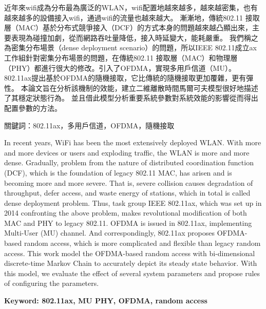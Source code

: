 \begin{abstractzh}
近年來wifi成為分布最為廣泛的WLAN，wifi配置地越來越多，越來越密集，也有越來越多的設備接入wifi，通過wifi的流量也越來越大。
漸漸地，傳統802.11 接取層（MAC）基於分布式競爭接入（DCF）的方式本身的問題越來越凸顯出來，主要表現為碰撞加劇，從而網路吞吐量降低，接入時延變大，能耗嚴重。
我們稱之為密集分布場景（dense deployment scenario）的問題，所以IEEE 802.11成立ax工作組針對密集分布場景的問題，在傳統802.11 接取層（MAC）和物理層（PHY）都進行很大的修改。引入了OFDMA，實現多用戶信道（MU）。
802.11ax提出基於OFDMA的隨機接取，它比傳統的隨機接取更加覆雜，更有彈性。
本論文旨在分析該機制的效能，建立二維離散時間馬爾可夫模型很好地描述了其穩定狀態行為。
並且借此模型分析重要系統參數對系統效能的影響從而得出配置參數的方法。

\noindent
關鍵詞：802.11ax，多用戶信道，OFDMA，隨機接取
\end{abstractzh}

\begin{abstracten}
In recent years, WiFi has been the most extensively deployed WLAN. 
With more and more devices or users and exploding traffic, the WLAN is more and more dense. 
Gradually, problem from the nature of distributed coordination function (DCF), which is the foundation of legacy 802.11 MAC, has arisen and is becoming more and more severe. 
That is, severe collision causes degradation of throughput, defer access, and waste energy of stations, which in total is called dense deployment problem. 
Thus, task group IEEE 802.11ax, which was set up in 2014 confronting the above problem, makes revolutional modification of both MAC and PHY to legacy 802.11. 
OFDMA is issued in 802.11ax, implementing Multi-User (MU) channel. 
And correspondingly, 802.11ax proposes OFDMA-based random access, which is more complicated and flexible than legacy random access. 
This work model the OFDMA-based random access with bi-dimensional discrete-time Markov Chain to accurately depict its steady state behavior. 
With this model, we evaluate the effect of several system parameters and propose rules of configuring the parameters.



\noindent
\textbf{Keyword: 802.11ax, MU PHY, OFDMA, random access}
\end{abstracten}

\begin{comment}
\category{I2.10}{Computing Methodologies}{Artificial Intelligence --
Vision and Scene Understanding} \category{H5.3}{Information
Systems}{Information Interfaces and Presentation (HCI) -- Web-based
Interaction.}

\terms{Design, Human factors, Performance.}

\keywords{802.11ax, MU PHY, OFDMA, random access}
\end{comment}

